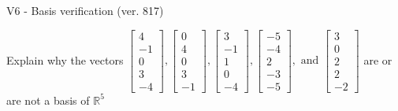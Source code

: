 \begin{exercise}
  \begin{exerciseTitle}V6 - Basis verification (ver. 817)\end{exerciseTitle}
  \begin{exerciseStatement}
    Explain why the vectors \(\left[\begin{array}{r}
4 \\
-1 \\
0 \\
3 \\
-4
\end{array}\right] , \left[\begin{array}{r}
0 \\
4 \\
0 \\
3 \\
-1
\end{array}\right] , \left[\begin{array}{r}
3 \\
-1 \\
1 \\
0 \\
-4
\end{array}\right] , \left[\begin{array}{r}
-5 \\
-4 \\
2 \\
-3 \\
-5
\end{array}\right] , \text{ and } \left[\begin{array}{r}
3 \\
0 \\
2 \\
2 \\
-2
\end{array}\right]\) are or are not a basis of \(\mathbb{R}^5\)	



\end{exerciseStatement}
\end{exercise}
